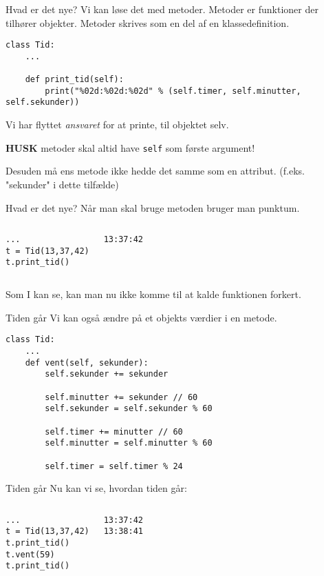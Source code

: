 \begin{frame}[fragile]{Hvad er det nye?}
Vi kan løse det med metoder. Metoder er funktioner der tilhører objekter. Metoder skrives som en del af en klassedefinition.
\begin{lstlisting}[style=python]
class Tid:
    ...
    	
    def print_tid(self):
	    print("%02d:%02d:%02d" % (self.timer, self.minutter, self.sekunder))
\end{lstlisting}
\pause
Vi har flyttet \textit{ansvaret} for at printe, til objektet selv.

\textbf{HUSK} metoder skal altid have \texttt{self} som første argument!

Desuden må ens metode ikke hedde det samme som en attribut. (f.eks. "sekunder" i dette tilfælde)
\end{frame}

\begin{frame}[fragile]{Hvad er det nye?}
Når man skal bruge metoden bruger man punktum.
\begin{columns}
	\begin{lstlisting}[style=python]
...
t = Tid(13,37,42)
t.print_tid()
	\end{lstlisting}
	\pause
	\begin{lstlisting}[style=python]
13:37:42
	\end{lstlisting}
\end{columns}
\pause
Som I kan se, kan man nu ikke komme til at kalde funktionen forkert.
\end{frame}


\begin{frame}[fragile]{Tiden går}
Vi kan også ændre på et objekts værdier i en metode.
	\begin{lstlisting}[style=python]
class Tid:
    ...
    def vent(self, sekunder):
        self.sekunder += sekunder
        
        self.minutter += sekunder // 60
        self.sekunder = self.sekunder % 60
        
        self.timer += minutter // 60
        self.minutter = self.minutter % 60
        
        self.timer = self.timer % 24
	\end{lstlisting}
\end{frame}


\begin{frame}[fragile]{Tiden går}
Nu kan vi se, hvordan tiden går:
\begin{columns}
	\begin{lstlisting}[style=python]
...
t = Tid(13,37,42)
t.print_tid()
t.vent(59)
t.print_tid()
	\end{lstlisting}
	\pause
	\begin{lstlisting}[style=python]
13:37:42
13:38:41
	\end{lstlisting}
\end{columns}
\end{frame}


